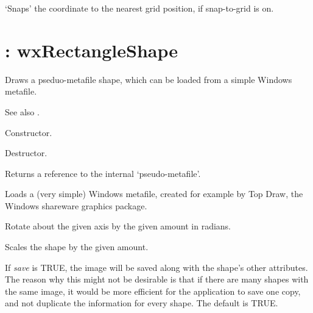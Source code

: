 

`Snaps' the coordinate to the nearest grid position, if snap-to-grid is on.


\section{: wxRectangleShape}\label{wxdrawnshape}

Draws a pseduo-metafile shape, which can be loaded from a simple Windows metafile.

See also .



Constructor.



Destructor.



Returns a reference to the internal `pseudo-metafile'.



Loads a (very simple) Windows metafile, created for example by Top Draw, the Windows shareware graphics package.



Rotate about the given axis by the given amount in radians.



Scales the shape by the given amount.



If {\it save} is TRUE, the image will be saved along with the shape's other attributes. The reason
why this might not be desirable is that if there are many shapes with the same image, it would be
more efficient for the application to save one copy, and not duplicate the information for every
shape. The default is TRUE.

